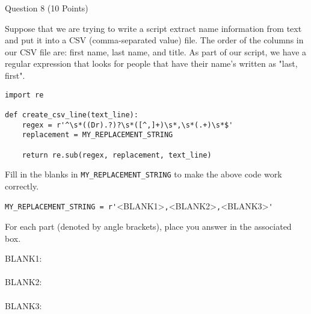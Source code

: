 \documentclass{article}
\begin{document}
\begin{minipage}{\textwidth}
    \noindent
    Question 8 (10 Points)
    \vspace{0.5cm}

    \noindent
    Suppose that we are trying to write a script extract name information from text and put it into a CSV (comma-separated value) file.
    The order of the columns in our CSV file are: first name, last name, and title.
    As part of our script, we have a regular expression that looks for people that have their name's written as "last, first".

    \begin{lstlisting}
import re

def create_csv_line(text_line):
    regex = r'^\s*((Dr).?)?\s*([^,]+)\s*,\s*(.+)\s*$'
    replacement = MY_REPLACEMENT_STRING

    return re.sub(regex, replacement, text_line)
    \end{lstlisting}

    Fill in the blanks in \verb|MY_REPLACEMENT_STRING| to make the above code work correctly.

    \verb|MY_REPLACEMENT_STRING = r'|\textsc{<BLANK1>}\verb|,|\textsc{<BLANK2>}\verb|,|\textsc{<BLANK3>}\verb|'|

    \vspace{0.25cm}
    For each part (denoted by angle brackets), place you answer in the associated box.
    \vspace{0.25cm}

    BLANK1: \\
     \\

    BLANK2: \\
     \\

    BLANK3: \\
     \\

\end{minipage}


\vspace{2cm}

\end{document}
